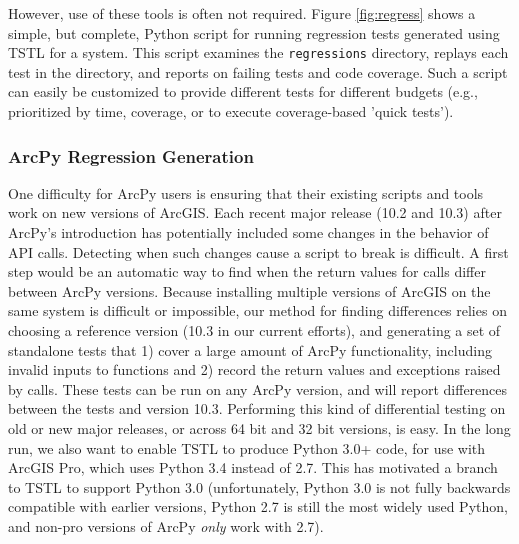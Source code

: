 However, use of these tools is often not required.  Figure \ref{fig:regress} shows a simple, but complete, Python script for running regression tests generated using TSTL for a system.  This script examines the {\tt regressions} directory, replays each test in the directory, and reports on failing tests and code coverage.  Such a script can easily be customized to provide different tests for different budgets (e.g., prioritized by time, coverage, or to execute coverage-based 'quick tests').

\subsubsection{ArcPy Regression Generation}

One difficulty for ArcPy users is ensuring that their existing scripts
and tools work on new versions of ArcGIS.  Each recent major release
(10.2 and 10.3) after ArcPy's introduction has potentially included some changes
in the behavior of API calls.  Detecting when such changes cause a
script to break is difficult.  A first step would be an automatic way
to find when the return values for calls differ between ArcPy
versions.
Because installing multiple versions of ArcGIS on the same system is
difficult or impossible, our method for finding differences relies on
choosing a reference version (10.3 in our current efforts), and
generating a set of standalone tests that 1) cover a large amount of
ArcPy functionality, including invalid inputs to functions and 2)
record the return values and exceptions raised by calls.  These tests
can be run on any ArcPy version, and will report differences between
the tests and version 10.3.  Performing this kind of differential
testing \cite{Differential} on old or new major releases, or across 64
bit and 32 bit versions, is easy.  In the long run, we also want to
enable TSTL to produce Python 3.0+ code, for use with ArcGIS Pro,
which uses Python 3.4 instead of 2.7.  This has motivated a branch to
TSTL to support Python 3.0 (unfortunately, Python 3.0 is not fully
backwards compatible with earlier versions, Python 2.7 is still
the most widely used Python, and non-pro versions of ArcPy \emph{only} work
with 2.7).


